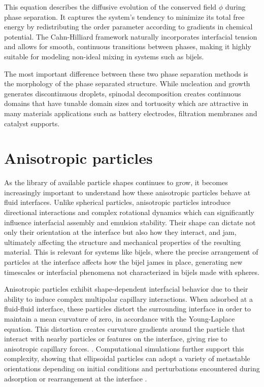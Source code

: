 This equation describes the diffusive evolution of the conserved field $\phi$ during phase separation. It captures the system's tendency to minimize its total free energy 
by redistributing the order parameter according to gradients in chemical potential. The Cahn-Hilliard framework naturally incorporates interfacial tension and allows for smooth, 
continuous transitions between phases, making it highly suitable for modeling non-ideal mixing in systems such as bijels.

The most important difference between these two phase separation methods is the morphology of the phase separated structure. While nucleation and growth generates discontinuous droplets,
spinodal decomposition creates continuous domains that have tunable domain sizes and tortuosity which are attractive in many materials applications such as battery electrodes, filtration
membranes and catalyst supports.

\section{Anisotropic particles}

As the library of available particle shapes continues to grow, it becomes increasingly important to understand how these anisotropic particles behave at fluid interfaces.
\cite{wu_recent_2016, cavallaro_curvature-driven_2011}
Unlike spherical particles, anisotropic particles introduce directional interactions and complex rotational dynamics which can significantly 
influence interfacial assembly and emulsion stability. \cite{read_dimerization_2020, davies_dipolar_2015,morgan_understanding_2013}
Their shape can dictate not only their orientation at the interface but also how they interact, and jam, 
ultimately affecting the structure and mechanical properties of the resulting material. \cite{hijnen_bijels_2015}
This is relevant for systems like bijels, where the precise arrangement of particles at the interface affects how the bijel james in place, generating new timescales or 
interfacial phenomena not characterized in bijels made with spheres. \cite{gunther_timescales_2014,hijnen_bijels_2015} 

Anisotropic particles exhibit shape-dependent interfacial behavior due to their ability to induce complex multipolar capillary interactions. When adsorbed at a fluid-fluid interface, these 
particles distort the surrounding interface in order to maintain a mean curvature of zero, in accordance with the Young-Laplace equation. This distortion creates curvature gradients around the 
particle that interact with nearby particles or features on the interface, giving rise to anisotropic capillary forces. \cite{loudet_capillary_2005, cheng_shape-anisotropic_2013}. 
Computational simulations further support this complexity, showing that ellipsoidal particles can adopt a variety of metastable orientations 
depending on initial conditions and perturbations encountered during adsorption or rearrangement at the interface \cite{gunther_lattice_2013, newton_influence_2014}. 

